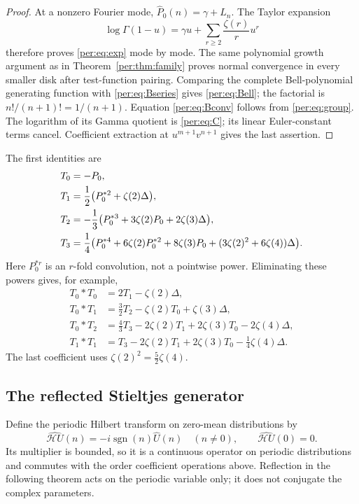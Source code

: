 \begin{proof}
At a nonzero Fourier mode, $\widehat P_0(n)=\gamma+L_n$. The Taylor
expansion
\[
 \log\Gamma(1-u)=\gamma u+
                     \sum_{r\ge2}\frac{\zeta(r)}r u^r
\]
therefore proves \eqref{per:eq:exp} mode by mode. The same polynomial
growth argument as in Theorem~\ref{per:thm:family} proves normal
convergence in every smaller disk after test-function pairing. Comparing
the complete Bell-polynomial generating function with
\eqref{per:eq:Bseries} gives \eqref{per:eq:Bell}; the factorial is
$n!/(n+1)!=1/(n+1)$. Equation \eqref{per:eq:Bconv} follows from
\eqref{per:eq:group}. The logarithm of its Gamma quotient is
\eqref{per:eq:C}; its linear Euler-constant terms cancel. Coefficient
extraction at $u^{m+1}v^{n+1}$ gives the last assertion.
\end{proof}

The first identities are
\begin{align}
 T_0&=-P_0,\notag\\
 T_1&=\frac12\bigl(P_0^{*2}+\zeta(2)\Delta\bigr),
 \label{per:eq:T1}\\
 T_2&=-\frac13\bigl(P_0^{*3}+3\zeta(2)P_0+2\zeta(3)\Delta\bigr),
 \label{per:eq:T2}\\
 T_3&=\frac14\bigl(P_0^{*4}+6\zeta(2)P_0^{*2}
          +8\zeta(3)P_0+(3\zeta(2)^2+6\zeta(4))\Delta\bigr).
 \label{per:eq:T3}
\end{align}
Here $P_0^{*r}$ is an $r$-fold convolution, not a pointwise power.
Eliminating these powers gives, for example,
\begin{align}
 T_0*T_0&=2T_1-\zeta(2)\Delta,\label{per:eq:00}\\
 T_0*T_1&=\frac32T_2-\zeta(2)T_0+\zeta(3)\Delta,
 \label{per:eq:01}\\
 T_0*T_2&=\frac43T_3-2\zeta(2)T_1+2\zeta(3)T_0
                                      -2\zeta(4)\Delta,
 \label{per:eq:02}\\
 T_1*T_1&=T_3-2\zeta(2)T_1+2\zeta(3)T_0
                                      -\frac14\zeta(4)\Delta.
 \label{per:eq:11}
\end{align}
The last coefficient uses $\zeta(2)^2=\tfrac52\zeta(4)$.

\subsection{The reflected Stieltjes generator}

Define the periodic Hilbert transform on zero-mean distributions by
\begin{equation}\label{per:eq:Hilbert}
 \widehat{\mathcal H U}(n)=-i\operatorname{sgn}(n)\widehat U(n)
 \quad(n\ne0),\qquad \widehat{\mathcal H U}(0)=0.
\end{equation}
Its multiplier is bounded, so it is a continuous operator on periodic
distributions and commutes with the order coefficient operations above.
Reflection in the following theorem acts on the periodic variable only;
it does not conjugate the complex parameters.

